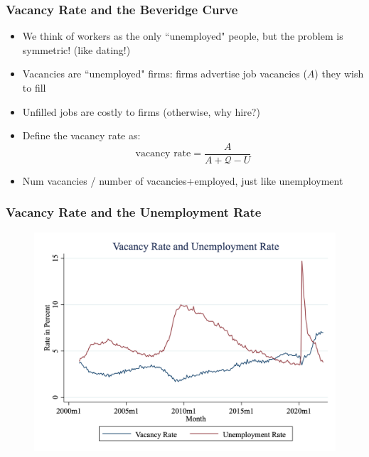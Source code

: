 \documentclass{beamer}
\begin{document}
\begin{frame}
\frametitle[alignment=center]{Vacancy Rate and the Beveridge Curve}
\begin{itemize}
\item We think of workers as the only ``unemployed" people, but the problem is symmetric! (like dating!)
\bigskip
\item Vacancies are ``unemployed" firms:  firms advertise job vacancies ($A$) they wish to fill
\bigskip
\item Unfilled jobs are costly to firms (otherwise, why hire?)
\bigskip
\item Define the vacancy rate as: 
$$\text{vacancy rate}=\frac{A}{A+\mathcal{Q}-U}$$
\item Num vacancies / number of vacancies+employed, just like unemployment
\end{itemize}
\end{frame}

\begin{frame}
\frametitle[alignment=center]{Vacancy Rate and the Unemployment Rate}
\begin{figure}
\centering
\includegraphics[scale=0.25]{Figures/Fig_6pt7.png}
\end{figure}
\end{frame}
\end{document}
